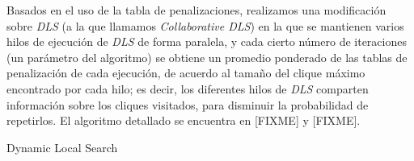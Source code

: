\documentclass[conference]{IEEEtran}
\begin{document}
Basados en el uso de la tabla de penalizaciones, realizamos una
modificación sobre \emph{DLS} (a la que llamamos \emph{Collaborative
DLS}) en la que se mantienen varios hilos de ejecución de \emph{DLS}
de forma paralela, y cada cierto número de iteraciones (un parámetro
del algoritmo) se obtiene un promedio ponderado de las tablas de
penalización de cada ejecución, de acuerdo al tamaño del clique máximo
encontrado por cada hilo; es decir, los diferentes hilos de \emph{DLS}
comparten información sobre los cliques visitados, para disminuir la
probabilidad de repetirlos. El algoritmo detallado se encuentra en
[FIXME] y [FIXME].

\begin{scriptsize}
\LinesNumbered
\begin{algoritmo}[htp]
\label{dls:algo}

 \caption{Dynamic Local Search}
  \DontPrintSemicolon
\end{algoritmo}
\end{scriptsize}
\end{document}
